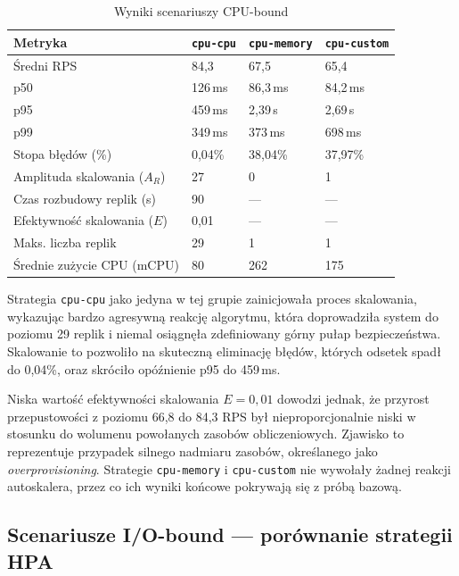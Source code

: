 \begin{table}[H]
  \centering
  \begin{tabularx}{\textwidth}{|l|X|X|X|}
    \hline
    \textbf{Metryka} & \texttt{cpu-cpu} & \texttt{cpu-memory} & \texttt{cpu-custom} \\
    \hline
    Średni RPS & 84,3 & 67,5 & 65,4 \\
    p50 & 126\,ms & 86,3\,ms & 84,2\,ms \\
    p95 & 459\,ms & 2,39\,s & 2,69\,s \\
    p99 & 349\,ms & 373\,ms & 698\,ms \\
    Stopa błędów (\%) & 0,04\% & 38,04\% & 37,97\% \\
    Amplituda skalowania ($A_R$) & 27 & 0 & 1 \\
    Czas rozbudowy replik (s) & 90 & — & — \\
    Efektywność skalowania ($E$) & 0,01 & — & — \\
    Maks. liczba replik & 29 & 1 & 1 \\
    Średnie zużycie CPU (mCPU) & 80 & 262 & 175 \\
    \hline
  \end{tabularx}
  \caption{Wyniki scenariuszy CPU-bound}
  \label{tab:cpu-results}
\end{table}

Strategia \texttt{cpu-cpu} jako jedyna w tej grupie zainicjowała proces skalowania, wykazując bardzo agresywną reakcję algorytmu, która doprowadziła system do poziomu 29 replik i niemal osiągnęła zdefiniowany górny pułap bezpieczeństwa. Skalowanie to pozwoliło na skuteczną eliminację błędów, których odsetek spadł do 0,04\%, oraz skróciło opóźnienie p95 do 459\,ms. 

Niska wartość efektywności skalowania $E = 0{,}01$ dowodzi jednak, że przyrost przepustowości z poziomu 66,8 do 84,3 RPS był nieproporcjonalnie niski w stosunku do wolumenu powołanych zasobów obliczeniowych. Zjawisko to reprezentuje przypadek silnego nadmiaru zasobów, określanego jako \textit{overprovisioning}. Strategie \texttt{cpu-memory} i \texttt{cpu-custom} nie wywołały żadnej reakcji autoskalera, przez co ich wyniki końcowe pokrywają się z próbą bazową.

\subsection{Scenariusze I/O-bound — porównanie strategii HPA}

